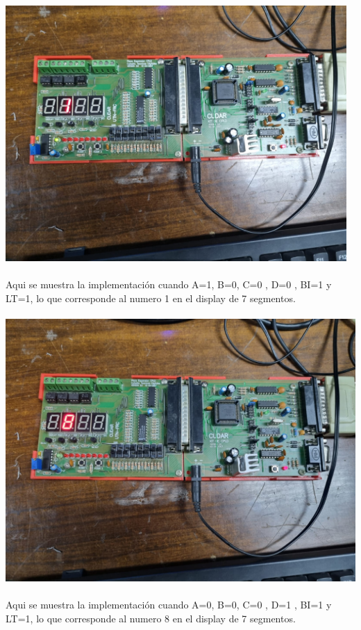 \paragraph{}
\includegraphics[width=13cm]{./imagenes/uno.jpeg}
\paragraph{}Aqui se muestra la implementación cuando A=1, B=0, C=0 , D=0 , BI=1 y LT=1, lo que corresponde al numero 1 en el display de 7 segmentos.
\paragraph{}
\includegraphics[width=15cm]{./imagenes/ocho.jpeg}
\paragraph{}Aqui se muestra la implementación cuando A=0, B=0, C=0 , D=1 , BI=1 y LT=1, lo que corresponde al numero 8 en el display de 7 segmentos.
